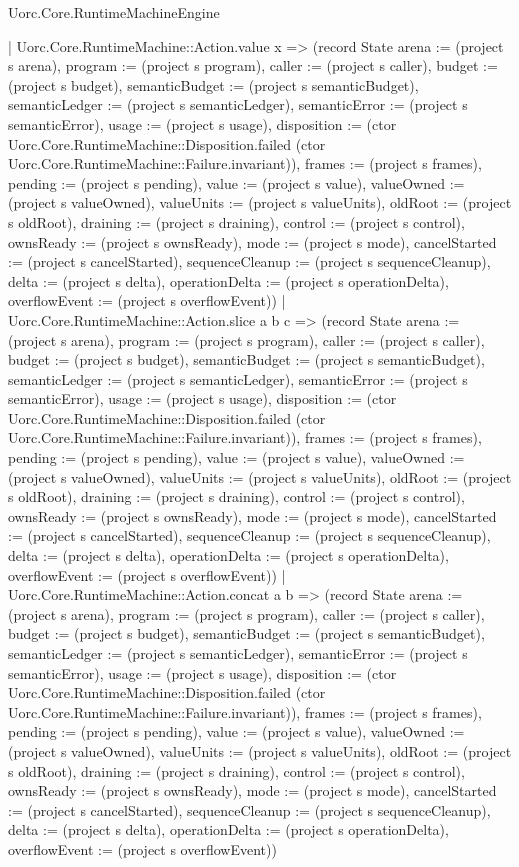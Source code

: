 \begin{lexlean}{Uorc.Core.RuntimeMachineEngine}
\begin{semanticmodule}
{      | Uorc.Core.RuntimeMachine::Action.value x => (record State {arena := (project s arena), program := (project s program), caller := (project s caller), budget := (project s budget), semanticBudget := (project s semanticBudget), semanticLedger := (project s semanticLedger), semanticError := (project s semanticError), usage := (project s usage), disposition := (ctor Uorc.Core.RuntimeMachine::Disposition.failed (ctor Uorc.Core.RuntimeMachine::Failure.invariant)), frames := (project s frames), pending := (project s pending), value := (project s value), valueOwned := (project s valueOwned), valueUnits := (project s valueUnits), oldRoot := (project s oldRoot), draining := (project s draining), control := (project s control), ownsReady := (project s ownsReady), mode := (project s mode), cancelStarted := (project s cancelStarted), sequenceCleanup := (project s sequenceCleanup), delta := (project s delta), operationDelta := (project s operationDelta), overflowEvent := (project s overflowEvent)})
      | Uorc.Core.RuntimeMachine::Action.slice a b c => (record State {arena := (project s arena), program := (project s program), caller := (project s caller), budget := (project s budget), semanticBudget := (project s semanticBudget), semanticLedger := (project s semanticLedger), semanticError := (project s semanticError), usage := (project s usage), disposition := (ctor Uorc.Core.RuntimeMachine::Disposition.failed (ctor Uorc.Core.RuntimeMachine::Failure.invariant)), frames := (project s frames), pending := (project s pending), value := (project s value), valueOwned := (project s valueOwned), valueUnits := (project s valueUnits), oldRoot := (project s oldRoot), draining := (project s draining), control := (project s control), ownsReady := (project s ownsReady), mode := (project s mode), cancelStarted := (project s cancelStarted), sequenceCleanup := (project s sequenceCleanup), delta := (project s delta), operationDelta := (project s operationDelta), overflowEvent := (project s overflowEvent)})
      | Uorc.Core.RuntimeMachine::Action.concat a b => (record State {arena := (project s arena), program := (project s program), caller := (project s caller), budget := (project s budget), semanticBudget := (project s semanticBudget), semanticLedger := (project s semanticLedger), semanticError := (project s semanticError), usage := (project s usage), disposition := (ctor Uorc.Core.RuntimeMachine::Disposition.failed (ctor Uorc.Core.RuntimeMachine::Failure.invariant)), frames := (project s frames), pending := (project s pending), value := (project s value), valueOwned := (project s valueOwned), valueUnits := (project s valueUnits), oldRoot := (project s oldRoot), draining := (project s draining), control := (project s control), ownsReady := (project s ownsReady), mode := (project s mode), cancelStarted := (project s cancelStarted), sequenceCleanup := (project s sequenceCleanup), delta := (project s delta), operationDelta := (project s operationDelta), overflowEvent := (project s overflowEvent)})
}
\end{semanticmodule}
\end{lexlean}
